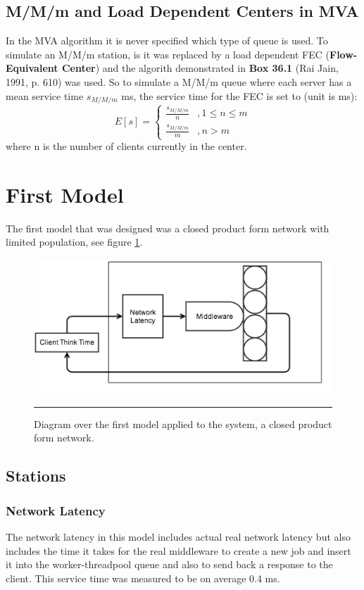 \documentclass[a4paper, 11pt]{article}
\begin{document}
	\subsection{M/M/m and Load Dependent Centers in MVA}
		In the MVA algorithm it is never specified which type of queue is used. To simulate an M/M/m station, is it was replaced by a load dependent FEC (\textbf{Flow-Equivalent Center}) and the algorith demonstrated in \textbf{Box 36.1} (Rai Jain, 1991, p. 610) was used. So to simulate a M/M/m queue where each server has a mean service time $s_{M/M/m}$ ms, the service time for the FEC is set to (unit is ms):
		\[
		E[s] =
			\begin{cases}
				\frac{s_{M/M/m}}{n} 		&, 1 \leq n \leq m \\
				\frac{s_{M/M/m}}{m} 		&, n > m
			\end{cases}
		\]
		where n is the number of clients currently in the center.

\section{First Model}\label{sec:first-model}
The first model that was designed was a closed product form network with limited population, see figure \ref{fig:firstmodel}.

\begin{figure}[cht!]
	\centering
		\includegraphics[width=0.8\linewidth]{firstmodel}
		\rule{35em}{0.5pt}
	\caption{Diagram over the first model applied to the system, a closed product form network.}
	\label{fig:firstmodel}
\end{figure}

	\subsection{Stations}
		\subsubsection{Network Latency}
		The network latency in this model includes actual real network latency but also includes the time it takes for the real middleware to create a new job and insert it into the worker-threadpool queue and also to send back a response to the client. This service time was measured to be on average 0.4 ms.
\end{document}
